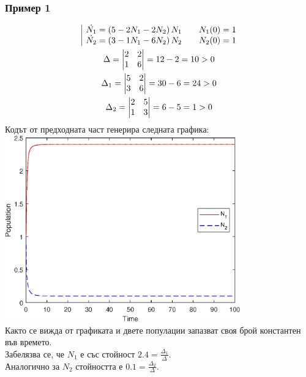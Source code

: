 \documentclass[a4paper,fleqn,12pt]{article}
\begin{document}
\subsubsection*{Пример 1}
\begin{gather*}
	\begin{array}{|l@{}}
	\dot{N_1} = \left(5 - 2N_1 - 2 N_2 \right) N_1 \qquad N_1(0) = 1\\
	\dot{N_2} = \left(3 - 1N_1 - 6 N_2 \right) N_2  \qquad N_2(0) = 1
	\end{array} \\
	\Delta = \begin{vmatrix} 2 & 2 \\ 1 & 6 \end{vmatrix} = 12 - 2 = 10 > 0 \\
	\Delta_1 = \begin{vmatrix}5 & 2 \\ 3 & 6 \end{vmatrix} = 30 - 6 = 24 > 0 \\
	\Delta_2 = \begin{vmatrix}2 & 5\\ 1 & 3 \end{vmatrix} = 6-5 = 1 > 0
\end{gather*}
Кодът от предходната част генерира следната графика: \\
\includegraphics [width=4in]{ecologyComp_01.eps} \\
Както се вижда от графиката и двете популации запазват своя брой константен във времето. \\
Забелязва се, че $N_1$ е със стойност $2.4 = \frac{\Delta_1}{\Delta}$. \\
Аналогично за $N_2$ стойността е $0.1 = \frac{\Delta_2}{\Delta}$. \\
\end{document}
